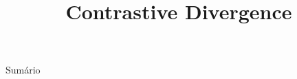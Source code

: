 \documentclass{beamer}
\title[Contrastive Divergence]{Contrastive Divergence}
\numberwithin{equation}{section}%
\begin{document}
\begin{frame}
  \titlepage%
\end{frame}

\begin{frame}{Sumário}%
  \begin{columns}[t]
    \begin{column}{0.5\textwidth}
      \tableofcontents[sections={1-3}]
    \end{column}
    \begin{column}{0.5\textwidth}
      \tableofcontents[sections={4-}]
    \end{column}
  \end{columns}
\end{frame}









%
%
\end{document}

